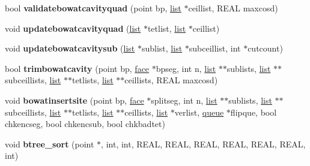 \begin{DoxyCompactItemize}
\item 
\hypertarget{classtetgenmesh_aacb874b3860abf9cdc000b29b9a2e4a8}{bool {\bfseries validatebowatcavityquad} (point bp, \hyperlink{classtetgenmesh_1_1list}{list} $\ast$ceillist, R\-E\-A\-L maxcosd)}\label{classtetgenmesh_aacb874b3860abf9cdc000b29b9a2e4a8}

\item 
\hypertarget{classtetgenmesh_aea39bfef229c9c7234318eabf92c136f}{void {\bfseries updatebowatcavityquad} (\hyperlink{classtetgenmesh_1_1list}{list} $\ast$tetlist, \hyperlink{classtetgenmesh_1_1list}{list} $\ast$ceillist)}\label{classtetgenmesh_aea39bfef229c9c7234318eabf92c136f}

\item 
\hypertarget{classtetgenmesh_af249f45e2822ef8feb0c23f433ce640f}{void {\bfseries updatebowatcavitysub} (\hyperlink{classtetgenmesh_1_1list}{list} $\ast$sublist, \hyperlink{classtetgenmesh_1_1list}{list} $\ast$subceillist, int $\ast$cutcount)}\label{classtetgenmesh_af249f45e2822ef8feb0c23f433ce640f}

\item 
\hypertarget{classtetgenmesh_a2832ef9cb2418e64dd9587397675ddd0}{bool {\bfseries trimbowatcavity} (point bp, \hyperlink{classtetgenmesh_1_1face}{face} $\ast$bpseg, int n, \hyperlink{classtetgenmesh_1_1list}{list} $\ast$$\ast$sublists, \hyperlink{classtetgenmesh_1_1list}{list} $\ast$$\ast$subceillists, \hyperlink{classtetgenmesh_1_1list}{list} $\ast$$\ast$tetlists, \hyperlink{classtetgenmesh_1_1list}{list} $\ast$$\ast$ceillists, R\-E\-A\-L maxcosd)}\label{classtetgenmesh_a2832ef9cb2418e64dd9587397675ddd0}

\item 
\hypertarget{classtetgenmesh_a1d3fb01475bee35433e5559aa19dea15}{void {\bfseries bowatinsertsite} (point bp, \hyperlink{classtetgenmesh_1_1face}{face} $\ast$splitseg, int n, \hyperlink{classtetgenmesh_1_1list}{list} $\ast$$\ast$sublists, \hyperlink{classtetgenmesh_1_1list}{list} $\ast$$\ast$subceillists, \hyperlink{classtetgenmesh_1_1list}{list} $\ast$$\ast$tetlists, \hyperlink{classtetgenmesh_1_1list}{list} $\ast$$\ast$ceillists, \hyperlink{classtetgenmesh_1_1list}{list} $\ast$verlist, \hyperlink{classtetgenmesh_1_1queue}{queue} $\ast$flipque, bool chkencseg, bool chkencsub, bool chkbadtet)}\label{classtetgenmesh_a1d3fb01475bee35433e5559aa19dea15}

\item 
\hypertarget{classtetgenmesh_a04565c2eacf0f22de7984cbd9b6e43ae}{void {\bfseries btree\-\_\-sort} (point $\ast$, int, int, R\-E\-A\-L, R\-E\-A\-L, R\-E\-A\-L, R\-E\-A\-L, R\-E\-A\-L, R\-E\-A\-L, int)}\label{classtetgenmesh_a04565c2eacf0f22de7984cbd9b6e43ae}


\end{DoxyCompactItemize}
